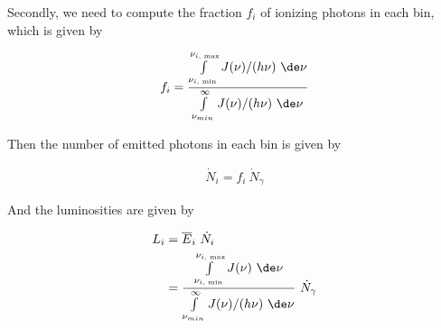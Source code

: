 Secondly, we need to compute the fraction $f_i$ of ionizing photons in each bin, which is given by

\begin{align}
	f_i = \frac{\int\limits_{\nu_{i \text{, min}}}^{\nu_{i \text{, max}}} J(\nu) / (h \nu)  \ \de 
\nu }{\int\limits_{\nu_{min}}^{\infty} J(\nu) / (h \nu) \ \de \nu}
\end{align}

Then the number of emitted photons in each bin is given by

\begin{align}
\dot{N}_i = f_i\ \dot{N}_\gamma
\end{align}

And the luminosities are given by

\begin{align}
	L_i &= \overline{E}_i \ \dot{N}_i \\
			&= \frac{\int\limits_{\nu_{i \text{, min}}}^{\nu_{i \text{, max}}} J(\nu) \ \de \nu 
}{\int\limits_{\nu_{min}}^{\infty} J(\nu) / (h \nu) \ \de \nu} \ \dot{N}_\gamma
\end{align}


